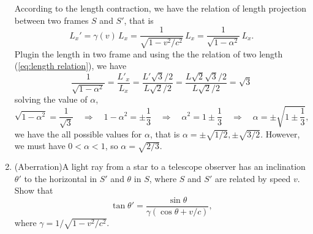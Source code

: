 \documentclass[12pt]{article}%
\begin{document}
\begin{enumerate}
{\begin{minipage}[c]{0.98\linewidth}
According to the length contraction, we have the relation of length projection between two frames $S$ and $S'$, that is 
\begin{equation}
L_x' = \gamma(v)\,L_x = \frac{1}{\sqrt{1-v^2/c^2}}\,L_x = \frac{1}{\sqrt{1-\alpha^2}}\,L_x.
\end{equation}
Plugin the length in two frame and using the the relation of two length (\ref{eq:length relation}), we have
\begin{equation}
\frac{1}{\sqrt{1-\alpha^2}}
= \frac{L'_x}{L_x} 
= \frac{L'\sqrt{3}/2}{L\sqrt{2}/2} 
= \frac{L\sqrt{2}\sqrt{3}/2}{L\sqrt{2}/2} 
= \sqrt{3}
\end{equation}
solving the value of $\alpha$, 
\begin{equation}
\sqrt{1-\alpha^2} = \frac{1}{\sqrt{3}}
\quad\Rightarrow\quad
1-\alpha^2 = \pm \frac{1}{3}
\quad\Rightarrow\quad
\alpha^2 = 1 \pm \frac{1}{3}
\quad\Rightarrow\quad
\alpha = \pm \sqrt{1\pm \frac{1}{3}},
\end{equation}
we have the all possible values for $\alpha$, that is $\alpha=\pm \sqrt{1/2}, \pm \sqrt{3/2}$. However, we must have $0<\alpha<1$, so $\alpha=\sqrt{2/3}$.
\end{minipage}}




\newpage
\item (Aberration)A light ray from a star to a telescope observer has an inclination $\theta'$ to the horizontal in $S'$ and $\theta$ in $S$, where $S$ and $S'$ are related by speed $v$. Show that 
\begin{equation*}
\tan\theta' = \frac{\sin\theta}{\gamma(\cos\theta+v/c)},
\end{equation*}
where $\gamma = 1/\sqrt{1-v^2/c^2}$.

\end{enumerate}
\end{document}

